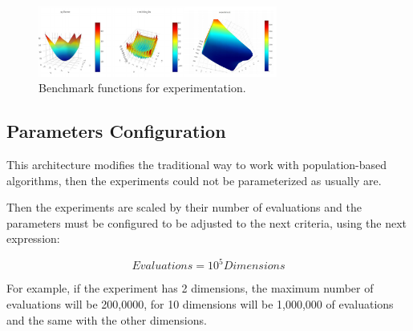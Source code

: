 \documentclass[runningheads]{llncs}
\begin{document}
\begin{figure}[htp]
  \centering
    \includegraphics[width=0.7\textwidth]{img/benchmark.png}
    \caption{Benchmark functions for experimentation.} \label{fig6}
    \end{figure}

\subsection{Parameters Configuration} 

This architecture modifies the traditional way to work with population-based
algorithms, then the experiments could not be parameterized as usually are.

Then the experiments are scaled by their number of evaluations and the
parameters must be configured to be adjusted to the next criteria, using the
next expression:

\begin{equation}
    \label{eq:hesitancy-interpretation}
   Evaluations = 10^{5} Dimensions
   \end{equation}

   For example, if the experiment has 2 dimensions, the maximum number of
   evaluations will be 200,0000, for 10 dimensions will be 1,000,000 of evaluations
   and the same with the other dimensions.
\end{document}
